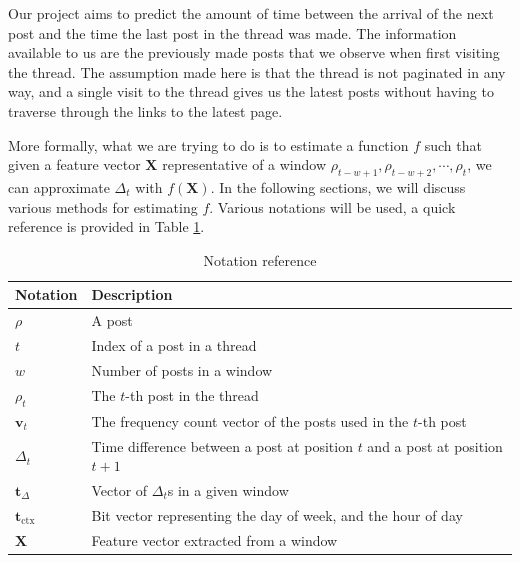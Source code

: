\newcommand{\vocab}{\mathbf{v}}
\newcommand{\dtvec}{\mathbf{t}_\Delta}
\newcommand{\ctxvec}{\mathbf{t}_\text{ctx}}
\newcommand{\dt}{\Delta_t}
\newcommand{\prerror}{Pr_{error}}
\newcommand{\weights}{\mathbf{w}}
\newcommand{\X}{\mathbf{X}}
\newcommand{\post}{\rho}
\renewcommand{\t}{t}
\newcommand{\w}{w}
Our project aims to predict the amount of time between the arrival of the next 
post and the time the last post in the thread was made. The information 
available to us are the previously made posts that we observe when first 
visiting the thread. The assumption made here is that the thread is not 
paginated in any way, and a single visit to the thread gives us the latest posts 
without having to traverse through the links to the latest page.

More formally, what we are trying to do is to estimate a function $f$ such that 
given a feature vector $\X$ representative of a window $\post_{t - w + 
1},\post_{t - w + 2},\cdots ,\post_t$, we can approximate $\dt$ with $f(\X)$. In 
the following sections, we will discuss various methods for estimating $f$.  
Various notations will be used, a quick reference is provided in Table 
\ref{table:notations}.

\begin{table}
	\begin{center}
	\begin{tabular}{l l}
	\hline
Notation	&	Description\\
	\hline
$\post$		&	A post\\
$\t$		&	Index of a post in a thread\\
$\w$		&	Number of posts in a window\\
$\post_\t$	&	The $t$-th post in the thread\\
$\vocab_\t$	&	The frequency count vector of the posts used in the $t$-th 
	post\\
$\dt$		&	Time difference between a post at position $\t$ and a post at 
	position $\t+1$ \\
$\dtvec$	&	Vector of $\dt$s in a given window\\
$\ctxvec$	&	Bit vector representing the day of week, and the hour of day\\
$\X$		&	Feature vector extracted from a window\\
	\hline
	\end{tabular}
\end{center}
\caption{Notation reference} \label{table:notations}
\end{table}


